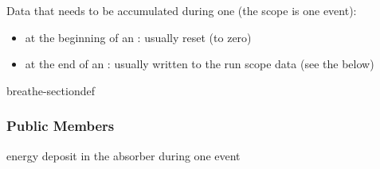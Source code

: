 \documentclass[letterpaper,10pt,english]{sphinxmanual}
\begin{document}
\begin{fulllineitems}
\label{\detokenize{Simulation/SimulationCodeDoc:_CPPv415ResultsPerEvent}}
\pysigstartsignatures
\pysigstartmultiline
{}
\pysigstopmultiline
\pysigstopsignatures{}
\sphinxAtStartPar
Data that needs to be accumulated during one  (the scope is one event): 

\sphinxAtStartPar
\begin{itemize}
\item {} 
\sphinxAtStartPar
at the beginning of an : usually reset (to zero)

\item {} 
\sphinxAtStartPar
at the end of an : usually written to the run scope data (see the  below) 

\end{itemize}


\begin{sphinxuseclass}{breathe-sectiondef}\subsubsection*{Public Members}

\begin{fulllineitems}
\label{\detokenize{Simulation/SimulationCodeDoc:_CPPv4N15ResultsPerEvent8fEdepAbsE}}
\pysigstartsignatures
\pysigstartmultiline
{}
\pysigstopmultiline
\pysigstopsignatures
\sphinxAtStartPar
energy deposit in the absorber during one event 

\end{fulllineitems}



\end{sphinxuseclass}
\end{fulllineitems}
\end{document}

